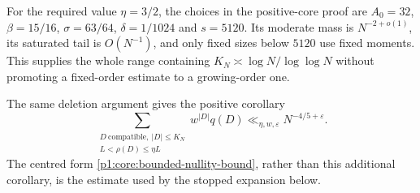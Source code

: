 For the required value $\eta=3/2$, the choices in the positive-core
proof are
$A_0=32$, $\beta=15/16$, $\sigma=63/64$, $\delta=1/1024$ and
$s=5120$. Its moderate mass is $N^{-2+o(1)}$, its saturated tail is
$O(N^{-1})$, and only fixed sizes below $5120$ use fixed moments.
This supplies the whole range containing
$K_N\asymp\log N/\log\log N$ without promoting a fixed-order
estimate to a growing-order one.

The same deletion argument gives the positive corollary
\[
 \sum_{\substack{D\ \mathrm{compatible},\ |D|\le K_N\\
                    L<\rho(D)\le\eta L}}
 w^{|D|}q(D)\ll_{\eta,w,\varepsilon}N^{-4/5+\varepsilon}.
\]
The centred form \eqref{p1:core:bounded-nullity-bound}, rather than
this additional corollary, is the estimate used by the stopped
expansion below.
